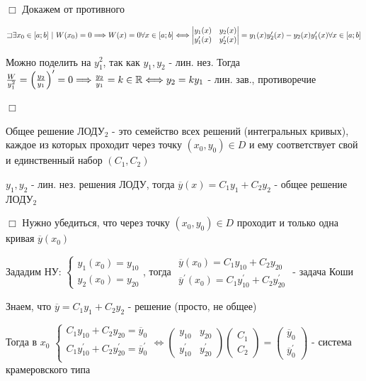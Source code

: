 \documentclass[12pt]{article}
\begin{document}
    $\Box$ Докажем от противного

    $\letsymbol \exists x_0 \in [a;b] \ | \ W(x_0)= 0 \Longrightarrow W(x) = 0 \forall x \in [a;b] \Longleftrightarrow
    \begin{vmatrix}y_1(x) & y_2(x) \\ y_1^\prime(x) & y_2^\prime(x)\end{vmatrix} = y_1(x) y_2^\prime(x) - y_2(x) y_1^\prime(x) \forall x \in [a;b]$

    Можно поделить на $y_1^2$, так как $y_1, y_2$ - лин. нез. Тогда $\frac{W}{y^2_1} = \left(\frac{y_2}{y_1}\right)^\prime = 0 \Longrightarrow \frac{y_2}{y_1} = k \in \mathbb{R} \Longleftrightarrow y_2 = k y_1$ - лин. зав., противоречие

    $\Box$

    \Nota Общее решение ЛОДУ$_2$ - это семейство всех решений (интегральных кривых), каждое из которых проходит через точку
    $(x_0, y_0) \in D$ и ему соответствует свой и единственный набор $(C_1, C_2)$

     $y_1, y_2$ - лин. нез. решения ЛОДУ, тогда $\overline{y}(x) = C_1 y_1 + C_2 y_2$ - общее решение ЛОДУ$_2$

    $\Box$ Нужно убедиться, что через точку $(x_0, y_0) \in D$ проходит и только одна кривая $\overline{y}(x_0)$

    Зададим НУ: $\begin{cases}
                     y_1(x_0) = y_{10} \\
                     y_2(x_0) = y_{20}
    \end{cases}$, тогда $\begin{matrix}\overline{y}(x_0) = C_1 y_{10} + C_2 y_{20} \\ \overline{y}^\prime(x_0) = C_1 y_{10}^\prime + C_2 y_{20}^\prime\end{matrix}$ - задача Коши

    Знаем, что $\overline{y} = C_1 y_1 + C_2 y_2$ - решение (просто, не общее)

    Тогда в $x_0$ $\begin{cases}
                       C_1 y_{10} + C_2 y_{20} = \overline{y}_0 \\
                       C_1 y_{10}^\prime + C_2 y_{20}^\prime = \overline{y}_0^\prime \\
    \end{cases} \Longleftrightarrow \begin{pmatrix}y_{10} & y_{20} \\ y_{10}^\prime & y_{20}^\prime \end{pmatrix} \begin{pmatrix}C_1 \\ C_2\end{pmatrix} = \begin{pmatrix}\overline{y}_0 \\ \overline{y}^\prime_0\end{pmatrix}$ -
    система крамеровского типа
\end{document}
